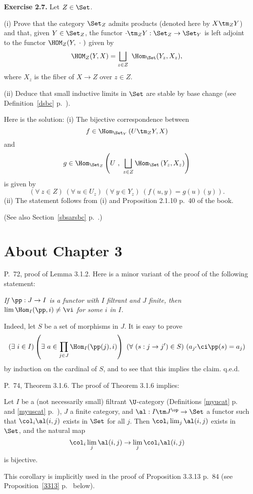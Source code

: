 \documentclass[12pt]{article}
\theoremstyle{remark}
\theoremstyle{definition}
\begin{document}
\nn\textbf{Exercise 2.7.} Let $Z\in\Set$.

\nn(i) Prove that the category $\Set_Z$ admits products (denoted here by $X\tm_Z Y$) and that, given $Y\in\Set_Z$, the functor $\cdot\tm_ZY:\Set_Z\to\Set_Y$ is left adjoint to the functor $\HOM_Z(Y,\ \cdot\ )$ given by 
$$
\HOM_Z(Y, X)=\bigsqcup_{z\in Z}\ \Hom_{\Set}(Y_z,X_z),
$$ 
where $X_z$ is the fiber of $X\to Z$ over $z\in Z$.

\nn(ii) Deduce that small inductive limits in $\Set$ are stable by base change (see Definition~\ref{dsbc} p.~).

Here is the solution: (i) The bijective correspondence between 
$$
f\in\Hom_{\Set_Y}\left(U\tm_ZY,X\right)
$$ 
and 
$$
g\in\Hom_{\Set_Z}\left(U\ ,\ \bigsqcup_{z\in Z}\Hom_\Set\left(Y_z,X_z\right)\right)
$$ 
is given by 
$$
(\forall\ z\in Z)\ \left(\forall\ u\in U_z\right)\ \left(\forall\ y\in Y_z\right)\ (f(u,y)=g(u)(y)).
$$ 
(ii) The statement follows from (i) and Proposition 2.1.10 p.~40 of the book.

(See also Section~\ref{sbsarsbc} p.~.)


\section{About Chapter 3}


\begin{s} 
P.~72, proof of Lemma 3.1.2. Here is a minor variant of the proof of the following statement: 

\emph{If $\pp:J\to I$ is a functor with $I$ filtrant and $J$ finite, then $\lim\Hom_I(\pp,i)\neq\vi$ for some $i$ in $I$.} 

Indeed, let $S$ be a set of morphisms in $J$. It is easy to prove 
$$
(\exists\ i\in I)\left(\exists\ a\in\prod_{j\in J}\Hom_I(\pp(j),i)\right)\ (\forall\ (s:j\to j')\in S)\ (a_{j'}\ci\pp(s)=a_j) 
$$ 
by induction on the cardinal of $S$, and to see that this implies the claim. q.e.d.
\end{s}


\begin{s} 
P.~74, Theorem 3.1.6. The proof of Theorem 3.1.6 implies: 
\begin{prop}
Let $I$ be a (not necessarily small) filtrant $\U$-category (Definitions \ref{myucat} p.~ and \ref{myuscat} p.~), $J$ a finite category, and $\al:I\tm J^{\op}\to\Set$ a functor such that $\col_i\al(i,j)$ exists in $\Set$ for all $j$. Then $\col_i\lim_j\al(i,j)$ exists in $\Set$, and the natural map 
$$
\col_i\lim_j\al(i,j)\to
\lim_j\col_i\al(i,j)
$$ 
is bijective. 
\end{prop} 
This corollary is implicitly used in the proof of Proposition 3.3.13 p.~84 (see Proposition~\ref{3313} p.~ below).
\end{s}
\end{document}

